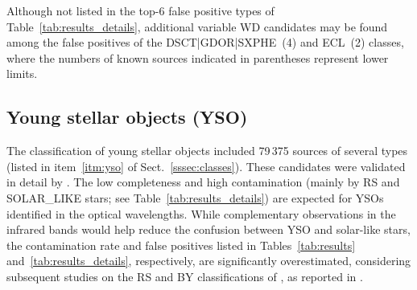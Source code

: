 \documentclass[longauth]{aa}
\begin{document}
Although not listed in the top-6 false positive types of Table~\ref{tab:results_details}, additional variable WD candidates may be found among the false positives of the DSCT|GDOR|SXPHE~(4) and ECL~(2) classes, where the numbers of known sources indicated in parentheses represent lower limits.



\subsection{Young stellar objects (YSO)\label{ssec:yso}}

The classification of young stellar objects included 79\,375 sources of several types (listed in item~\ref{itm:yso} of Sect.~\ref{sssec:classes}). These candidates were validated in detail by \citet{DR3-DPACP-172}. 
The low completeness and high contamination (mainly by RS and SOLAR\_LIKE stars; see Table~\ref{tab:results_details}) are expected for YSOs identified in the optical wavelengths. While complementary observations in the infrared bands would help reduce the confusion between YSO and solar-like stars, the contamination rate and false positives listed in Tables~\ref{tab:results} and~\ref{tab:results_details}, respectively, are significantly overestimated, considering subsequent studies on the RS and BY classifications of \citet{2020ApJS..249...18C}, as reported in \citet{DR3-DPACP-172}.
\end{document}
